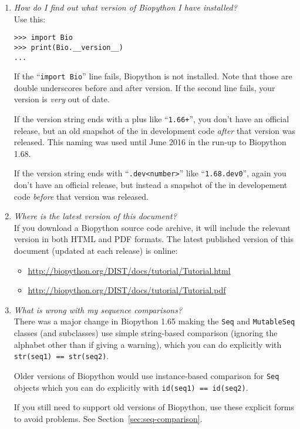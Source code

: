 \begin{enumerate}
  \item \emph{How do I find out what version of Biopython I have installed?} \\
  Use this:
\begin{verbatim}
>>> import Bio
>>> print(Bio.__version__)
...
\end{verbatim}
  If the ``\verb|import Bio|'' line fails, Biopython is not installed.
  Note that those are double underscores before and after version.
  If the second line fails, your version is \emph{very} out of date.

  If the version string ends with a plus like ``\verb|1.66+|'', you
  don't have an official release, but an old snapshot of the in
  development code \emph{after} that version was released. This naming
  was used until June 2016 in the run-up to Biopython 1.68.

  If the version string ends with ``\verb|.dev<number>|'' like
  ``\verb|1.68.dev0|'', again you don't have an official release,
  but instead a snapshot of the in developement code \emph{before}
  that version was released.

  \item \emph{Where is the latest version of this document?}\\
  If you download a Biopython source code archive, it will include the
  relevant version in both HTML and PDF formats.  The latest published
  version of this document (updated at each release) is online:
  \begin{itemize}
  \item \url{http://biopython.org/DIST/docs/tutorial/Tutorial.html}
  \item \url{http://biopython.org/DIST/docs/tutorial/Tutorial.pdf}
  \end{itemize}

  \item \emph{What is wrong with my sequence comparisons?} \\
  There was a major change in Biopython 1.65 making the \verb|Seq| and
  \verb|MutableSeq| classes (and subclasses) use simple string-based
  comparison (ignoring the alphabet other than if giving a warning),
  which you can do explicitly with \verb|str(seq1) == str(seq2)|.

  Older versions of Biopython would use instance-based comparison
  for \verb|Seq| objects which you can do explicitly with
  \verb|id(seq1) == id(seq2)|.

  If you still need to support old versions of Biopython, use these
  explicit forms to avoid problems. See Section~\ref{sec:seq-comparison}.


\end{enumerate}
